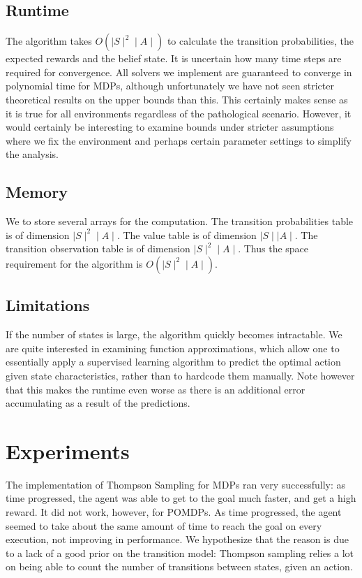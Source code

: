 \documentclass{pset}
\begin{document}
\subsection{Runtime}
The algorithm takes $O(\mid S \mid ^2 \mid A \mid)$ to calculate the transition probabilities, the
expected rewards and the belief state. It is uncertain how many time steps are required for
convergence. All solvers we implement are guaranteed to converge in polynomial time for MDPs,
although unfortunately we have not seen stricter theoretical results on the
upper bounds than this. This certainly makes sense as it is true for all
environments regardless of the pathological scenario. However, it would
certainly be interesting to examine bounds under stricter assumptions where we
fix the environment and perhaps certain parameter settings to simplify the
analysis.

\subsection{Memory}
We to store several arrays for the computation. The transition probabilities
table is of dimension $\mid S \mid ^2 \mid A \mid$. The value table is of
dimension $\mid S \mid \mid A \mid$. The transition observation table is of
dimension $\mid S \mid ^2 \mid A \mid$. Thus the space requirement for the
algorithm is $O(\mid S \mid ^2 \mid A \mid)$.

\subsection{Limitations}
If the number of states is large, the algorithm quickly becomes intractable. We
are quite interested in examining function approximations, which allow one to
essentially apply a supervised learning algorithm to predict the optimal action
given state characteristics, rather than to hardcode them manually. Note
however that this makes the runtime even worse as there is an additional error
accumulating as a result of the predictions.

\section{Experiments}
The implementation of Thompson Sampling for MDPs ran very successfully: as time
progressed, the agent was able to get to the goal much faster, and get a high
reward. It did not work, however, for POMDPs. As time progressed, the agent seemed
to take about the same amount of time to reach the goal on every execution, not
improving in performance. We hypothesize that the reason is due to a lack of
a good prior on the transition model: Thompson sampling relies a lot on being
able to count the number of transitions between states, given an action.
\end{document}

